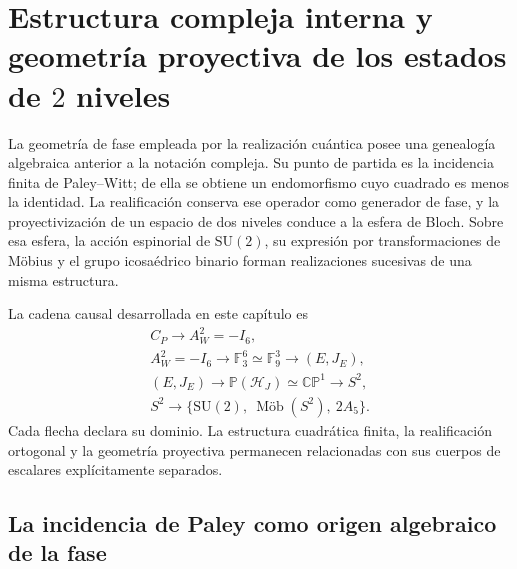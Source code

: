 \chapter{Estructura compleja interna y geometría proyectiva de los estados de \(2\) niveles}
\label{chap:geometria-proyectiva-bloch}

La geometría de fase empleada por la realización cuántica posee una
genealogía algebraica anterior a la notación compleja. Su punto de partida es
la incidencia finita de Paley--Witt; de ella se obtiene un endomorfismo cuyo
cuadrado es menos la identidad. La realificación conserva ese operador como
generador de fase, y la proyectivización de un espacio de dos niveles conduce
a la esfera de Bloch. Sobre esa esfera, la acción espinorial de
\(\mathrm{SU}(2)\), su expresión por transformaciones de Möbius y el grupo
icosaédrico binario forman realizaciones sucesivas de una misma estructura.

La cadena causal desarrollada en este capítulo es
\begin{equation}
 \boxed{
 \begin{gathered}
 C_P\longrightarrow A_W^2=-I_6,\\
 A_W^2=-I_6\longrightarrow
 \mathbb F_3^6\simeq\mathbb F_9^3
 \longrightarrow (E,J_E),\\
 (E,J_E)\longrightarrow
 \mathbb P(\mathcal H_J)\simeq\mathbb{CP}^{1}
 \longrightarrow S^2,\\
 S^2\longrightarrow
 \bigl\{\mathrm{SU}(2),\ \mathop{\text{M\"ob}}(S^2),\ 2A_5\bigr\}.
 \end{gathered}}
 \label{eq:cadena-paley-bloch-anexo}
\end{equation}
Cada flecha declara su dominio. La estructura cuadrática finita, la
realificación ortogonal y la geometría proyectiva permanecen relacionadas con
sus cuerpos de escalares explícitamente separados.

\section{La incidencia de Paley como origen algebraico de la fase}

